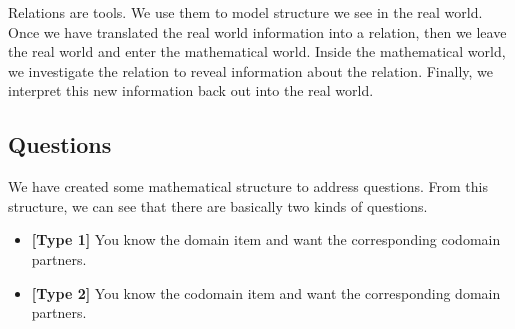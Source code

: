 \documentclass{ximera}
\begin{document}
Relations are tools.  We use them to model structure we see in the real world. Once we have translated the real world information into a relation, then we leave the real world and enter the mathematical world. Inside the mathematical world, we investigate the relation to reveal information about the relation.  Finally, we interpret this new information back out into the real world. \\








\subsection*{Questions}

\hfill\break

We have created some mathematical structure to address questions. From this structure, we can see that there are basically two kinds of questions.

\begin{itemize}
\item \textbf{\textcolor{blue!55!black}{[Type 1]}} You know the domain item and want the corresponding codomain partners.
\item \textbf{\textcolor{blue!55!black}{[Type 2]}} You know the codomain item and want the corresponding domain partners.
\end{itemize}
\end{document}
